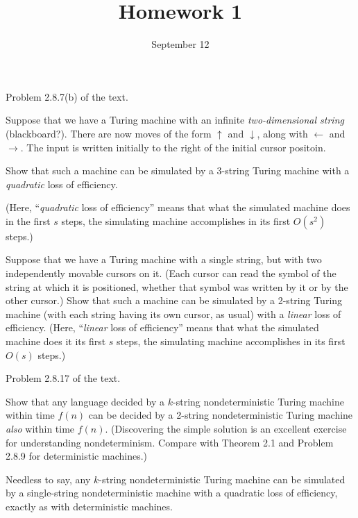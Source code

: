 \documentclass{../math167}
\title{Homework 1}
\author{}
\date{September 12}
\begin{document}
\begin{problems}
\item Problem 2.8.7(b) of the text.
  \begin{book}
    Suppose that we have a Turing machine with an infinite
    \emph{two-dimensional string} (blackboard?). There are now moves
    of the form \(\uparrow\) and \(\downarrow\), along with
    \(\leftarrow\) and \(\rightarrow\).  The input is written
    initially to the right of the initial cursor positoin.
    \begin{problems}[start=2]
    \item Show that such a machine can be simulated by a 3-string
      Turing machine with a \emph{quadratic} loss of efficiency.
    \end{problems}
  \end{book}
  (Here, ``\emph{quadratic} loss of efficiency'' means that what the
  simulated machine does in the first \(s\) steps, the simulating
  machine accomplishes in its first \(O(s^2)\) steps.)

  \begin{solution}
  \end{solution}

\item Suppose that we have a Turing machine with a single string, but
  with two independently movable cursors on it.  (Each cursor can read
  the symbol of the string at which it is positioned, whether that
  symbol was written by it or by the other cursor.)  Show that such a
  machine can be simulated by a 2-string Turing machine (with each
  string having its own cursor, as usual) with a \emph{linear} loss of
  efficiency.  (Here, ``\emph{linear} loss of efficiency'' means that
  what the simulated machine does it its first \(s\) steps, the
  simulating machine accomplishes in its first \(O(s)\) steps.)

  \begin{solution}
  \end{solution}

\item Problem 2.8.17 of the text.
  \begin{book}
    Show that any language decided by a \(k\)-string nondeterministic
    Turing machine within time \(f(n)\) can be decided by a 2-string
    nondeterministic Turing machine \emph{also} within time \(f(n)\).
    (Discovering the simple solution is an excellent exercise for
    understanding nondeterminism.  Compare with Theorem 2.1 and
    Problem 2.8.9 for deterministic machines.)

    Needless to say, any \(k\)-string nondeterministic Turing machine
    can be simulated by a single-string nondeterministic machine with
    a quadratic loss of efficiency, exactly as with deterministic
    machines.
  \end{book}

  \begin{solution}
  \end{solution}
\end{problems}
\end{document}
